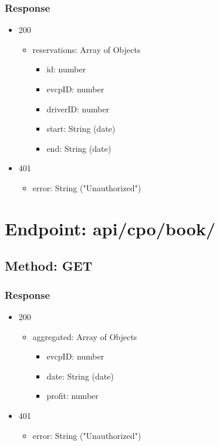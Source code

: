 \subsubsection*{Response}
\begin{itemize}
    \item 200
          \begin{itemize}
              \item reservations: Array of Objects
                    \begin{itemize}
                        \item id: number
                        \item evcpID: number
                        \item driverID: number
                        \item start: String (date)
                        \item end: String (date)
                    \end{itemize}
          \end{itemize}
    \item 401
          \begin{itemize}
              \item error: String ("Unauthorized")
          \end{itemize}
\end{itemize}

\section*{Endpoint: api/cpo/book/}
\subsection*{Method: GET}
\subsubsection*{Response}
\begin{itemize}
    \item 200
          \begin{itemize}
              \item aggregated: Array of Objects
                    \begin{itemize}
                        \item evcpID: number
                        \item date: String (date)
                        \item profit: number
                    \end{itemize}
          \end{itemize}
    \item 401
          \begin{itemize}
              \item error: String ("Unauthorized")
          \end{itemize}
\end{itemize}

